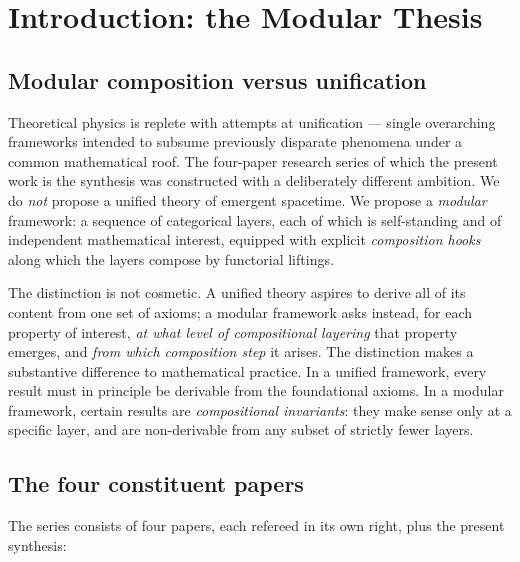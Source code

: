 \documentclass[12pt]{article}
\theoremstyle{definition}
\theoremstyle{remark}
\begin{document}
\section{Introduction: the Modular Thesis}
\label{sec:intro}

\subsection{Modular composition versus unification}

Theoretical physics is replete with attempts at unification --- single
overarching frameworks intended to subsume previously disparate phenomena under
a common mathematical roof. The four-paper research series of which the present
work is the synthesis was constructed with a deliberately different ambition.
We do \emph{not} propose a unified theory of emergent spacetime. We propose a
\emph{modular} framework: a sequence of categorical layers, each of which is
self-standing and of independent mathematical interest, equipped with explicit
\emph{composition hooks} along which the layers compose by functorial liftings.

The distinction is not cosmetic. A unified theory aspires to derive all of its
content from one set of axioms; a modular framework asks instead, for each
property of interest, \emph{at what level of compositional layering} that
property emerges, and \emph{from which composition step} it arises. The
distinction makes a substantive difference to mathematical practice. In a
unified framework, every result must in principle be derivable from the
foundational axioms. In a modular framework, certain results are
\emph{compositional invariants}: they make sense only at a specific layer, and
are non-derivable from any subset of strictly fewer layers.

\subsection{The four constituent papers}

The series consists of four papers, each refereed in its own right, plus the
present synthesis:
\end{document}
